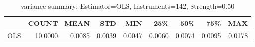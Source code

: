\begin{table}[ht]
\centering
\caption{variance summary: Estimator=OLS, Instruments=142, Strength=0.50}
\begin{tabular}{lrrrrrrrr}
\toprule
 & COUNT & MEAN & STD & MIN & 25\% & 50\% & 75\% & MAX \\
\midrule
OLS & 10.0000 & 0.0085 & 0.0039 & 0.0047 & 0.0060 & 0.0074 & 0.0095 & 0.0178 \\
\bottomrule
\end{tabular}
\end{table}

